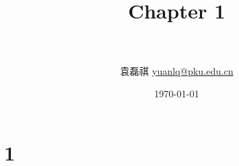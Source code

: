 \documentclass[a4,12pt]{ctexart}
\title{
   \vspace{-0.8in}
   \horrule{0.5pt} \\[0.5cm]
   \huge \bfseries{Chapter 1} \\
   \horrule{2pt} \\[0.5cm]
}
\author{袁磊祺 \quad \href{mailto:yuanlq@pku.edu.cn}{yuanlq@pku.edu.cn}}
\date{\today}
\begin{document}


\maketitle

\section{1}





% 
% 
\end{document}
